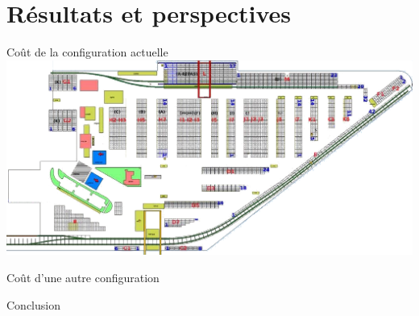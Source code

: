 \section{Résultats et perspectives}

\begin{frame}{Coût de la configuration actuelle}
  \includegraphics[width=\textwidth]{../images/Plan_Terminal.png}
\end{frame}

\begin{frame}{Coût d'une autre configuration}
  
\end{frame}

\begin{frame}{Conclusion}
\end{frame}
